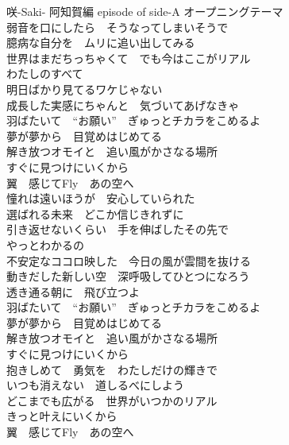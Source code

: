
{咲-Saki- 阿知賀編 episode of side-A オープニングテーマ}
{\quad\\\kasho
弱音を口にしたら　そうなってしまいそうで\\
臆病な自分を　ムリに追い出してみる\\
世界はまだちっちゃくて　でも今はここがリアル\\
わたしのすべて\\

明日ばかり見てるワケじゃない\\
成長した実感にちゃんと　気づいてあげなきゃ\\

羽ばたいて　“お願い”　ぎゅっとチカラをこめるよ\\
夢が夢から　目覚めはじめてる\\
解き放つオモイと　追い風がかさなる場所\\
すぐに見つけにいくから\\
翼　感じてFly　あの空へ\\[1em]

憧れは遠いほうが　安心していられた\\
選ばれる未来　どこか信じきれずに\\
引き返せないくらい　手を伸ばしたその先で\\
やっとわかるの\\

不安定なココロ映した　今日の風が雲間を抜ける\\
動きだした新しい空　深呼吸してひとつになろう\\
透き通る朝に　飛び立つよ\\[1em]

羽ばたいて　“お願い”　ぎゅっとチカラをこめるよ\\
夢が夢から　目覚めはじめてる\\
解き放つオモイと　追い風がかさなる場所\\
すぐに見つけにいくから\\

抱きしめて　勇気を　わたしだけの輝きで\\
いつも消えない　道しるべにしよう\\
どこまでも広がる　世界がいつかのリアル\\
きっと叶えにいくから\\
翼　感じてFly　あの空へ
}
